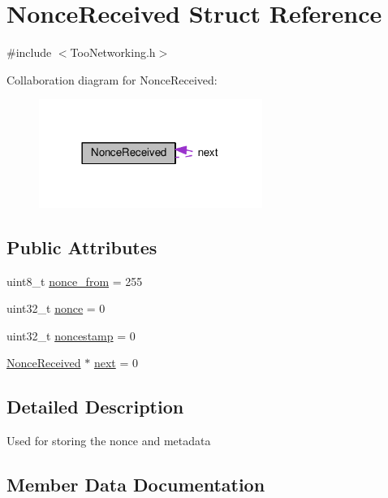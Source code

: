 \hypertarget{structNonceReceived}{}\section{Nonce\+Received Struct Reference}
\label{structNonceReceived}


{\ttfamily \#include $<$Too\+Networking.\+h$>$}



Collaboration diagram for Nonce\+Received\+:\nopagebreak
\begin{figure}[H]
\begin{center}
\leavevmode
\includegraphics[width=206pt]{structNonceReceived__coll__graph}
\end{center}
\end{figure}
\subsection*{Public Attributes}
\begin{DoxyCompactItemize}
\item 
uint8\+\_\+t \hyperlink{structNonceReceived_aa6f2777bb591400ce057bd1fa9b23fca}{nonce\+\_\+from} = 255
\item 
uint32\+\_\+t \hyperlink{structNonceReceived_a8da2f90de05746f252706f24ec5bc539}{nonce} = 0
\item 
uint32\+\_\+t \hyperlink{structNonceReceived_ae159a71415a2908807ef1ed39f0b9dfa}{noncestamp} = 0
\item 
\hyperlink{structNonceReceived}{Nonce\+Received} $\ast$ \hyperlink{structNonceReceived_ad976d0df8941f1f626de24afd2febca7}{next} = 0
\end{DoxyCompactItemize}


\subsection{Detailed Description}
Used for storing the nonce and metadata 

\subsection{Member Data Documentation}
